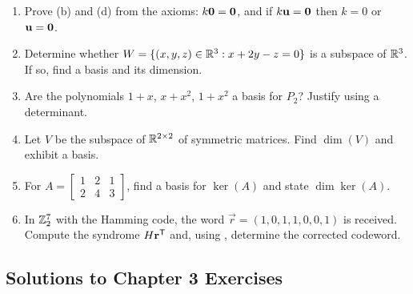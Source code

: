 \begin{enumerate}[label=\textbf{3.\arabic*},leftmargin=2.6em,itemsep=6pt]
\item Prove (b) and (d) from the axioms: $k\mathbf{0}=\mathbf{0}$, and if $k\mathbf{u}=\mathbf{0}$ then $k=0$ or $\mathbf{u}=\mathbf{0}$.

\item Determine whether $W=\{(x,y,z)\in\mathbb{R}^3:x+2y-z=0\}$ is a subspace of $\mathbb{R}^3$. If so, find a basis and its dimension.

\item Are the polynomials $1+x$, $x+x^2$, $1+x^2$ a basis for $P_2$? Justify using a determinant.

\item Let $V$ be the subspace of $\mathbb{R}^{2\times2}$ of symmetric matrices. Find $\dim(V)$ and exhibit a basis.

\item For $A=\left[\begin{smallmatrix}1&2&1\\2&4&3\end{smallmatrix}\right]$, find a basis for $\ker(A)$ and state $\dim\ker(A)$.

\item In $\mathbb{Z}_2^7$ with the Hamming code, the word $\vec{r}=(1,0,1,1,0,0,1)$ is received. Compute the syndrome $H\mathbf{r}^{\mathsf{T}}$ and, using , determine the corrected codeword.
\end{enumerate}

\subsection*{Solutions to Chapter 3 Exercises}

